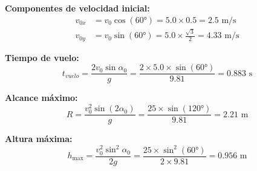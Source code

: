 \documentclass{article}
\begin{document}
	\textbf{Componentes de velocidad inicial:}
	\begin{align}
		v_{0x} &= v_0 \cos(60°) = 5.0 \times 0.5 = 2.5 \text{ m/s} \\
		v_{0y} &= v_0 \sin(60°) = 5.0 \times \frac{\sqrt{3}}{2} = 4.33 \text{ m/s}
	\end{align}
	
	\textbf{Tiempo de vuelo:}
	\begin{equation}
		t_{vuelo} = \frac{2v_0 \sin \alpha_0}{g} = \frac{2 \times 5.0 \times \sin(60°)}{9.81} = 0.883 \text{ s}
	\end{equation}
	
	\textbf{Alcance máximo:}
	\begin{equation}
		R = \frac{v_0^2 \sin(2\alpha_0)}{g} = \frac{25 \times \sin(120°)}{9.81} = 2.21 \text{ m}
	\end{equation}
	
	\textbf{Altura máxima:}
	\begin{equation}
		h_{\max} = \frac{v_0^2 \sin^2 \alpha_0}{2g} = \frac{25 \times \sin^2(60°)}{2 \times 9.81} = 0.956 \text{ m}
	\end{equation}
	
\end{document}
